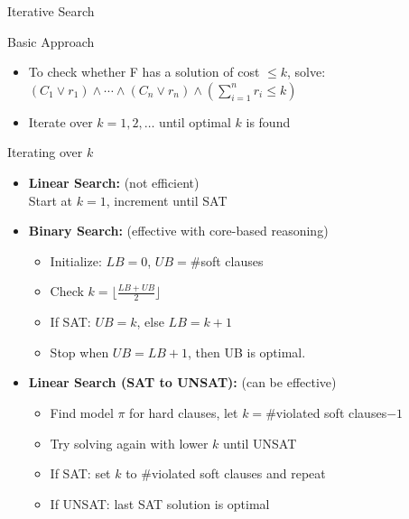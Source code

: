 \documentclass[t,english]{sdqbeamer}
\begin{document}
\begin{frame}{Iterative Search}
\begin{block}{Basic Approach}
\begin{itemize}
	\item To check whether F has a solution of cost $\leq k$, solve: $(C_1 \vee r_1) \wedge \cdots \wedge (C_n \vee r_n) \wedge \left(\sum_{i=1}^n r_i \leq k\right)$
	\item Iterate over $k = 1, 2, \dots$ until optimal $k$ is found
\end{itemize}
\end{block}
\begin{block}{Iterating over $k$}
	\begin{itemize}
		\item \textbf{Linear Search:} (not efficient)\\
		Start at $k = 1$, increment until SAT
		\item \textbf{Binary Search:} (effective with core-based reasoning)\\
		\begin{itemize}
			\item Initialize: $LB = 0$, $UB = \#$soft clauses
			\item Check $k = \lfloor \frac{LB + UB}{2} \rfloor$
			\item If SAT: $UB = k$, else $LB = k + 1$
			\item Stop when $UB = LB + 1$, then UB is optimal.
		\end{itemize}
		\item \textbf{Linear Search (SAT to UNSAT):} (can be effective)\\
		\begin{itemize}
			\item Find model $\pi$ for hard clauses, let $k = \#$violated soft clauses$-1$
			\item Try solving again with lower $k$ until UNSAT
			\item If SAT: set $k$ to $\#$violated soft clauses and repeat
			\item If UNSAT: last SAT solution is optimal
		\end{itemize}
	\end{itemize}
\end{block}
\end{frame}
\end{document}
